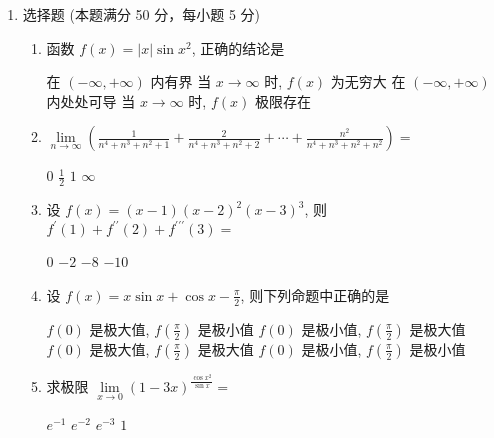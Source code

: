 

\begin{enumerate}
	\item
	选择题 (本题满分 50 分，每小题 5 分)
\begin{enumerate}
	\item
	函数 $f(x)=|x| \sin x^{2}$, 正确的结论是  
	
	
	



\fourchoices
{在 $(-\infty,+\infty)$ 内有界}
{当 $x \rightarrow \infty$ 时, $f(x)$ 为无穷大}
{在 $(-\infty,+\infty)$ 内处处可导}
{当 $x \rightarrow \infty$ 时, $f(x)$ 极限存在}


\item 
$ \lim\limits _{n \rightarrow \infty}\left(\frac{1}{n^{4}+n^{3}+n^{2}+1}+\frac{2}{n^{4}+n^{3}+n^{2}+2}+\cdots+\frac{n^{2}}{n^{4}+n^{3}+n^{2}+n^{2}}\right)= $  


\fourchoices
{$ 0 $}
{$\frac{1}{2}$}
{$ 1 $}
{$\infty$}

\item 
设 $f(x)=(x-1)(x-2)^{2}(x-3)^{3}$, 则 $f^{\prime}(1)+f^{\prime \prime}(2)+f^{\prime \prime \prime}(3)=$  


\fourchoices
{$ 0 $}
{$-2$}
{$-8$}
{$-10$}

\item 
设 $f(x)=x \sin x+\cos x-\frac{\pi}{2}$, 则下列命题中正确的是  


\fourchoices
{$f(0)$ 是极大值, $f\left(\frac{\pi}{2}\right)$ 是极小值}
{$f(0)$ 是极小值, $f\left(\frac{\pi}{2}\right)$ 是极大值}
{$f(0)$ 是极大值, $f\left(\frac{\pi}{2}\right)$ 是极大值}
{$f(0)$ 是极小值, $f\left(\frac{\pi}{2}\right)$ 是极小值}


\item 
求极限 $\lim\limits _{x \rightarrow 0}(1-3 x)^{\frac{\cos x^{2}}{\sin x}}=$  


\fourchoices
{$e^{-1}$}
{$e^{-2}$}
{$e^{-3}$}
{$ 1 $}


\end{enumerate}
\end{enumerate}
